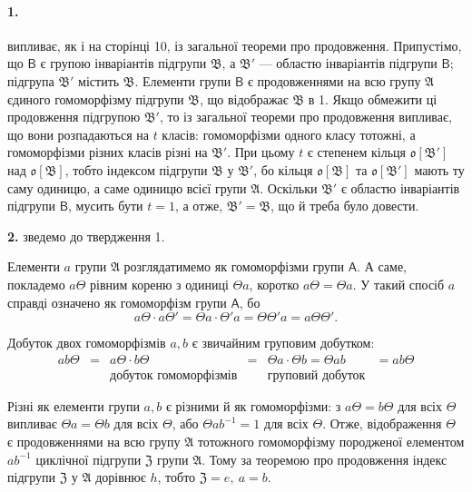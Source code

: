 \documentclass[11pt]{article}
\begin{document}
\paragraph{1.}
випливає, як і на сторінці 10, із загальної теореми про продовження. Припустімо, що \(\mathsf B\) є групою інваріантів підгрупи \(\mathfrak B\), а \(\mathfrak B'\) --- областю інваріантів підгрупи \(\mathsf B\); підгрупа \(\mathfrak B'\) містить \(\mathfrak B\). Елементи групи \(\mathsf B\) є продовженнями на всю групу \(\mathfrak A\) єдиного гомоморфізму підгрупи \(\mathfrak B\), що відображає \(\mathfrak B\) в 1. Якщо обмежити ці продовження підгрупою \(\mathfrak B'\), то із загальної теореми про продовження випливає, що вони розпадаються на \(t\) класів: гомоморфізми одного класу тотожні, а гомоморфізми різних класів різні на \(\mathfrak B'\). При цьому \(t\) є степенем кільця \(\mathfrak o[\mathfrak B']\) над \(\mathfrak o[\mathfrak B]\), тобто індексом підгрупи \(\mathfrak B\) у \(\mathfrak B'\), бо кільця \(\mathfrak o[\mathfrak B]\) та \(\mathfrak o[\mathfrak B']\) мають ту саму одиницю, а саме одиницю всієї групи \(\mathfrak A\). Оскільки \(\mathfrak B'\) є областю інваріантів підгрупи \(\mathsf B\), мусить бути \(t=1\), а отже, \(\mathfrak B'=\mathfrak B\), що й треба було довести.

\textbf{2.} зведемо до твердження 1.

Елементи \(a\) групи \(\mathfrak A\) розглядатимемо як гомоморфізми групи \(\mathsf A\). А саме, покладемо \(a\Theta\) рівним кореню з одиниці \(\Theta a\), коротко \(a\Theta=\Theta a\). У такий спосіб \(a\) справді означено як гомоморфізм групи \(\mathsf A\), бо
\[
a\Theta\cdot a\Theta'=\Theta a\cdot\Theta' a=\Theta\Theta' a=a\Theta\Theta'.
\]

Добуток двох гомоморфізмів \(a,b\) є звичайним груповим добутком:
\[
\begin{array}{cccccc}
ab\Theta&=&a\Theta\cdot b\Theta&=&\Theta a\cdot\Theta b=\Theta ab&=ab\Theta\\
&&\text{добуток гомоморфізмів}&&\text{груповий добуток}&
\end{array}
\]

Різні як елементи групи \(a,b\) є різними й як гомоморфізми: з \(a\Theta=b\Theta\) для всіх \(\Theta\) випливає \(\Theta a=\Theta b\) для всіх \(\Theta\), або \(\Theta ab^{-1}=1\) для всіх \(\Theta\). Отже, відображення \(\Theta\) є продовженнями на всю групу \(\mathfrak A\) тотожного гомоморфізму породженої елементом \(ab^{-1}\) циклічної підгрупи \(\mathfrak Z\) групи \(\mathfrak A\). Тому за теоремою про продовження індекс підгрупи \(\mathfrak Z\) у \(\mathfrak A\) дорівнює \(h\), тобто \(\mathfrak Z=e,\ a=b\).
\end{document}
